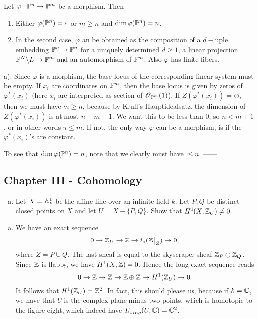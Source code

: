 \documentclass[11pt, english]{article}
\begin{document}
\begin{exc}[Exercise 7.3]
Let $\varphi: \mathbb{P}^n \to \mathbb{P}^m$ be a morphism. Then
\begin{enumerate}
  \item Either $\varphi(\mathbb{P}^n)=\ast$ or $m \geq n$ and $\dim \varphi(\mathbb{P}^n)=n$.
  \item In the second case, $\varphi$ an be obtained as the composition of a $d-$uple embedding $\mathbb{P}^n \to \mathbb{P}^n$ for a uniquely determined $d \geq 1$, a linear projection $\mathbb{P}^N \backslash L \to \mathbb{P}^m$ and an automorphism of $\mathbb{P}^m$. Also $\varphi$ has finite fibers.
\end{enumerate}
\end{exc}
\begin{sol}
  a). Since $\varphi$ is a morphism, the base locus of the corresponding linear system must be empty. If $x_i$ are coordinates on $\mathbb{P}^m$, then the base locus is given by zeros of $\varphi^\ast(x_i)$ (here $x_i$ are interpreted as section of $\operatorname{\mathscr{O}}_{\mathbb{P}^m}(1)$). If $Z(\varphi^\ast(x_i))= \varnothing$, then we must have $m \geq n$, because by Krull's Hauptidealsatz, the dimension of $Z(\varphi^\ast(x_i))$ is at most $n-m-1$. We want this to be less than $0$, so $n < m+1$, or in other words $n\le m$. If not, the only way $\varphi$ can be a morphism, is if the $\varphi^\ast(x_i)$'s are constant.

  To see that $\dim \varphi(\mathbb{P}^n)=n$, note that we clearly must have $\le n$. ------
\end{sol}


\subsection{Chapter III - Cohomology}

\begin{exc}[Exercise 2.1]
  \begin{enumerate}[a)]
  \item Let $X=\mathbb{A}_k^1$ be the affine line over an infinite field $k$. Let $P,Q$ be distinct closed points on $X$ and let $U=X - \{ P,Q\}$. Show that $H^1(X,\mathbb{Z}_U)\neq 0$.
  \end{enumerate}
\end{exc}

\begin{sol}
  \begin{enumerate}[a)]
  \item We have an exact sequence
\[
0 \to \Z_U \to \Z \to i_\ast(\restr{\Z}{Z}) \to 0,
\]
where $Z=P \cup Q$. The last sheaf is equal to the skyscraper sheaf $\mathbb{Z}_P \oplus \mathbb{Z}_Q$. Since $\mathbb{Z}$ is flabby, we have $H^1(X,\mathbb{Z})=0$. Hence the long exact sequence reads 
\[
0 \to \mathbb{Z} \to \mathbb{Z} \to \mathbb{Z} \oplus \mathbb{Z} \to H^1(\mathbb{Z}_U) \to 0.
\]
It follows that $H^1(\mathbb{Z}_U)=\mathbb{Z}^2$. In fact, this should please us, because if $k=\mathbb{C}$, we have that $U$ is the complex plane minus two points, which is homotopic to the figure eight, which indeed have $H_{sing}^1(U,\mathbb{C})=\mathbb{C}^2$.
  \end{enumerate}
\end{sol}
\end{document}
